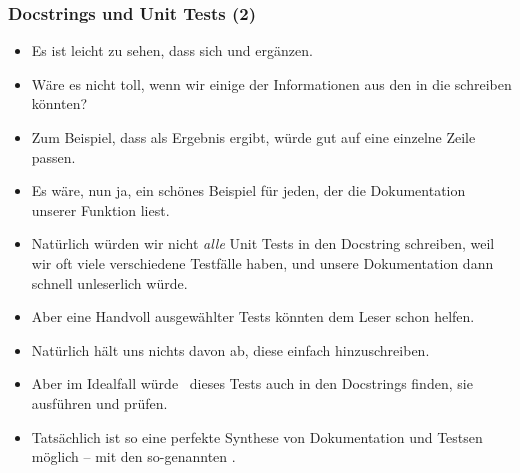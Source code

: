 \documentclass[aspectratio=169,mathserif,notheorems]{beamer}%
\begin{document}
\begin{frame}%
\frametitle{Docstrings und Unit Tests (2)}%
\begin{itemize}%
\item Es ist leicht zu sehen, dass sich  und  ergänzen.%
%
\item<2-> Wäre es nicht toll, wenn wir einige der Informationen aus den  in die   schreiben könnten?
%
\item<3-> Zum Beispiel, dass  als Ergebnis  ergibt, würde gut auf eine einzelne Zeile passen.%
%
\item<4-> Es wäre, nun ja, ein schönes Beispiel für jeden, der die Dokumentation unserer Funktion liest.%
%
\item<5-> Natürlich würden wir nicht \emph{alle} Unit Tests in den Docstring schreiben, weil wir oft viele verschiedene Testfälle haben, und unsere Dokumentation dann schnell unleserlich würde.%
%
\item<6-> Aber eine Handvoll ausgewählter Tests könnten dem Leser schon helfen.%
%
\item<7-> Natürlich hält uns nichts davon ab, diese einfach hinzuschreiben.%
%
\item<8-> Aber im Idealfall würde \pytest\ dieses Tests auch in den Docstrings finden, sie ausführen und prüfen.%
%
\item<9-> Tatsächlich ist so eine perfekte Synthese von Dokumentation und Testsen möglich -- mit den so-genannten \cite{PSF:P3D:TPSL:DTIPE}.%
%
\end{itemize}%
\end{frame}%
%
\end{document}
